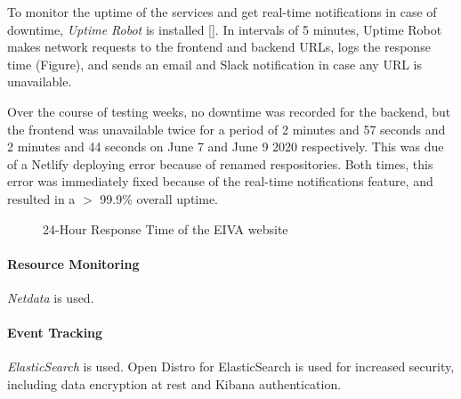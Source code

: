 \documentclass{article}
\begin{document}
To monitor the uptime of the services and get real-time notifications in case of downtime, \emph{Uptime Robot} is installed []. In intervals of 5 minutes, Uptime Robot makes network requests to the frontend and backend URLs, logs the response time (Figure), and sends an email and Slack notification in case any URL is unavailable.

Over the course of testing weeks, no downtime was recorded for the backend, but the frontend was unavailable twice for a period of 2 minutes and 57 seconds and 2 minutes and 44 seconds on June 7 and June 9 2020 respectively. This was due of a Netlify deploying error because of renamed respositories. Both times, this error was immediately fixed because of the real-time notifications feature, and resulted in a $>$ 99.9\% overall uptime.

\begin{figure}
\centering
{}
\caption{24-Hour Response Time of the EIVA website}
\end{figure}

\paragraph{Resource Monitoring}

\emph{Netdata} is used.

\paragraph{Event Tracking}

\emph{ElasticSearch} is used. Open Distro for ElasticSearch is used for increased security, including data encryption at rest and Kibana authentication.
\end{document}
